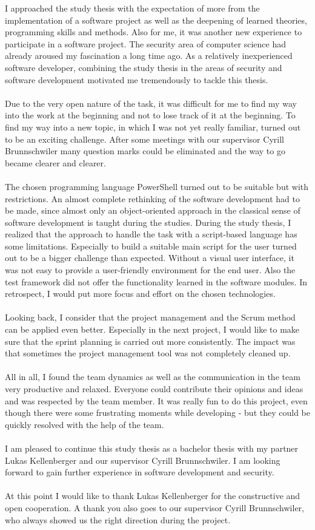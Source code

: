 I approached the study thesis with the expectation of more from the implementation of a software project as well as the deepening of learned theories, programming skills and methods. Also for me, it was another new experience to participate in a software project. The security area of computer science had already aroused my fascination a long time ago. As a relatively inexperienced software developer, combining the study thesis in the areas of security and software development motivated me tremendously to tackle this thesis.
\\\\
Due to the very open nature of the task, it was difficult for me to find my way into the work at the beginning and not to lose track of it at the beginning. To find my way into a new topic, in which I was not yet really familiar, turned out to be an exciting challenge. After some meetings with our supervisor Cyrill Brunnschwiler many question marks could be eliminated and the way to go became clearer and clearer.
\\\\
The chosen programming language PowerShell turned out to be suitable but with restrictions. An almost complete rethinking of the software development had to be made, since almost only an object-oriented approach in the classical sense of software development is taught during the studies. During the study thesis, I realized that the approach to handle the task with a script-based language has some limitations. Especially to build a suitable main script for the user turned out to be a bigger challenge than expected. Without a visual user interface, it was not easy to provide a user-friendly environment for the end user. Also the test framework did not offer the functionality learned in the software modules. In retrospect, I would put more focus and effort on the chosen technologies.
\\\\
Looking back, I consider that the project management and the Scrum method can be applied even better. Especially in the next project, I would like to make sure that the sprint planning is carried out more consistently. The impact was that sometimes the project management tool was not completely cleaned up.
\\\\
All in all, I found the team dynamics as well as the communication in the team very productive and relaxed. Everyone could contribute their opinions and ideas and was respected by the team member. It was really fun to do this project, even though there were some frustrating moments while developing - but they could be quickly resolved with the help of the team. 
\\\\
I am pleased to continue this study thesis as a bachelor thesis with my partner Lukas Kellenberger and our supervisor Cyrill Brunnschwiler. I am looking forward to gain further experience in software development and security.
\\\\
At this point I would like to thank Lukas Kellenberger for the constructive and open cooperation. A thank you also goes to our supervisor Cyrill Brunnschwiler, who always showed us the right direction during the project.
